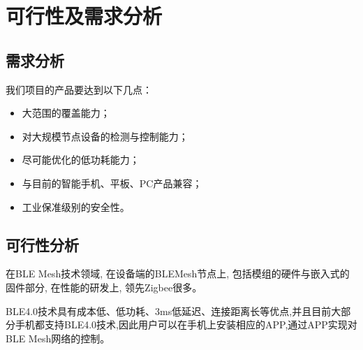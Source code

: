 \chapter{可行性及需求分析}

\section{需求分析}
我们项目的产品要达到以下几点：
  \begin{itemize}
    \item 大范围的覆盖能力；
    \item 对大规模节点设备的检测与控制能力；
    \item 尽可能优化的低功耗能力；
    \item 与目前的智能手机、平板、PC产品兼容；
    \item 工业保准级别的安全性。
  \end{itemize}

\section{可行性分析}
在BLE Mesh技术领域, 在设备端的BLEMesh节点上, 包括模组的硬件与嵌入式的固件部分, 在性能的研发上, 领先Zigbee很多。

BLE4.0技术具有成本低、低功耗、3ms低延迟、连接距离长等优点,并且目前大部分手机都支持BLE4.0技术,因此用户可以在手机上安装相应的APP,通过APP实现对BLE Mesh网络的控制。\cite{compareblezig}